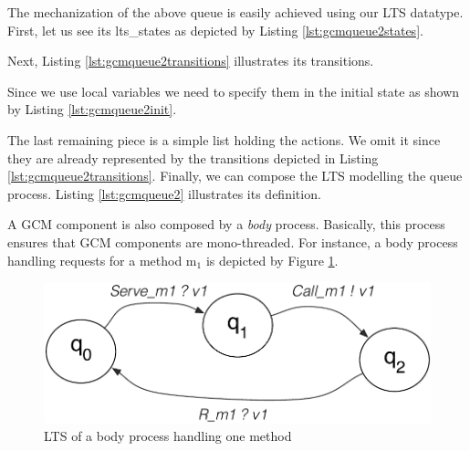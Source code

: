 	
		The mechanization of the above queue is easily achieved using our \textsf{LTS} datatype. First,
		let us see its \textsf{lts\_states} as depicted by Listing \ref{lst:gcmqueue2states}.
		
				
	   			
	   
   	\noindent Next, Listing \ref{lst:gcmqueue2transitions} illustrates its \textsf{transitions}.
   	
   	 		
 	
 	
	\noindent  Since we use local variables we need to specify them in the initial state as
	shown by Listing \ref{lst:gcmqueue2init}.	
	 	
 	   	 		


	\noindent The last remaining piece is a simple list holding the \textsf{actions}. We omit it
	since they are already represented by the \textsf{transitions} depicted in Listing \ref{lst:gcmqueue2transitions}.
	Finally, we can compose the \textsf{LTS} modelling the queue process. Listing \ref{lst:gcmqueue2}
	illustrates its definition.
	
		


	\noindent A \ac{GCM} component is also composed by a \textit{body} process. Basically, this process
	ensures that \ac{GCM} components are mono-threaded. For instance, a body process handling
	requests for a method \textsf{m$_1$} is depicted by Figure \ref{fig:gcmbody}.


	\begin{figure}[H]
		 \centering
		\includegraphics[scale=0.6]{figures/chapter6/gcmbody.pdf}
		\caption{LTS of a body process handling one method}
		\label{fig:gcmbody}		
	\end{figure}		


